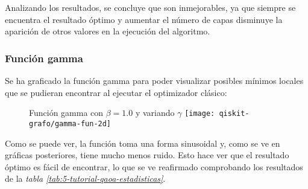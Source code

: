 Analizando los resultados, se concluye que son inmejorables, ya que siempre se encuentra el resultado óptimo y aumentar el número de capas disminuye la aparición de otros valores en la ejecución del algoritmo.

\subsubsection{Función gamma}

Se ha graficado la función gamma para poder visualizar posibles mínimos locales que se pudieran encontrar al ejecutar el optimizador clásico:

\begin{figure}[htbp]{}{Función gamma con \(\beta = 1.0\) y variando \(\gamma\)}
  \texttt{[image: qiskit-grafo/gamma-fun-2d]}
\end{figure}

Como se puede ver, la función toma una forma sinusoidal y, como se ve en gráficas posteriores, tiene mucho menos ruido. Esto hace ver que el resultado óptimo es fácil de encontrar, lo que se ve reafirmado comprobando los resultados de la \textit{tabla \ref{tab:5-tutorial-qaoa-estadisticas}}.



